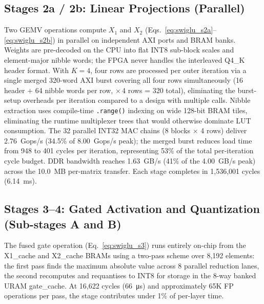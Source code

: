 \documentclass[manuscript,]{acmart} %
\begin{document}
\subsection*{Stages 2a / 2b: Linear Projections (Parallel)}

Two GEMV operations compute $X_1$ and $X_2$ (Eqs.~\eqref{eq:swiglu_s2a}--\eqref{eq:swiglu_s2b}) in parallel
on independent AXI ports and BRAM banks.
Weights are pre-decoded on the CPU into flat INT8 sub-block scales and
element-major nibble words; the FPGA never handles the interleaved Q4\_K header
format.
With $K=4$, four rows are processed per outer iteration via a single merged
320-word AXI burst covering all four rows simultaneously (16 header $+$ 64 nibble
words per row, $\times$\,4 rows = 320 total), eliminating the burst-setup overheads per iteration compared
to a design with multiple calls.
Nibble extraction uses compile-time \texttt{.range()} indexing on wide 128-bit
BRAM tiles, eliminating the runtime multiplexer trees that would otherwise dominate LUT consumption.
The 32 parallel INT32 MAC chains (8 blocks $\times$ 4 rows) deliver
\SI{2.76}{Gops/s} (34.5\% of \SI{8.00}{Gops/s} peak); the merged burst reduces
load time from 948 to 401 cycles per iteration, representing 53\% of the total per-iteration cycle budget.
DDR bandwidth reaches \SI{1.63}{GB/s} (41\% of the \SI{4.00}{GB/s} peak) across
the \SI{10.0}{MB} per-matrix transfer.
Each stage completes in 1,536,001 cycles (\SI{6.14}{ms}).

\subsection*{Stages 3--4: Gated Activation and Quantization (Sub-stages A and B)}

The fused gate operation (Eq.~\eqref{eq:swiglu_s3}) runs entirely on-chip from the X1\_cache and X2\_cache
BRAMs using a two-pass scheme over 8,192 elements: the first pass finds the
maximum absolute value across 8 parallel reduction lanes, the second recomputes
and requantises to INT8 for storage in the 8-way banked URAM gate\_cache.
At 16,622 cycles (\SI{66}{\micro\second}) and approximately 65K FP operations
per pass, the stage contributes under 1\% of per-layer time.
\end{document}
